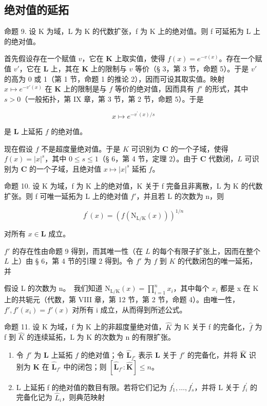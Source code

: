 \subsection{绝对值的延拓}

命题 9. 设 K 为域，L 为 K 的代数扩张，f 为 K 上的绝对值。则 f 可延拓为 L 上的绝对值。

首先假设存在一个赋值 \(v\)，它在 \(\mathbf{K}\) 上取实值，使得 \(f(x) = e^{-v(x)}\)。存在一个赋值 \(v'\)，它在 \(\mathbf{L}\) 上，其在 \(\mathbf{K}\) 上的限制与 \(v\) 等价（§ 3，第 3 节，命题 5）。于是 \(v'\) 的高为 0 或 1（第 1 节，命题 1 的推论 2），因而可设其取实值。映射 \(x \mapsto e^{-v'(x)}\) 在 \(\mathbf{K}\) 上的限制是与 \(f\) 等价的绝对值，因而具有 \(f^s\) 的形式，其中 \(s > 0\)（一般拓扑，第 IX 章，第 3 节，第 2 节，命题 5）。于是

\[
x \mapsto e ^ {- v ^ {\prime} (x) / s}
\]

是 \(\mathbf{L}\) 上延拓 \(f\) 的绝对值。

现在假设 \(f\) 不是超度量绝对值。于是 \(K\) 可识别为 \(\mathbf{C}\) 的一个子域，使得 \(f(x) = |x|^s\)，其中 \(0 \leqslant s \leqslant 1\)（§ 6，第 4 节，定理 2）。由于 \(\mathbf{C}\) 代数闭，\(L\) 可识别为 \(\mathbf{C}\) 的一个子域，且绝对值 \(x \mapsto |x|^s\) 延拓 \(f\)。

命题 10. 设 K 为域，f 为 K 上的绝对值，K 关于 f 完备且非离散，L 为 K 的代数扩张。则 f 可唯一延拓为 L 上的绝对值 \(f'\)，并且若 L 的次数为 n，则

\[
f ^ {\prime} (x) = \left(f (\mathrm{N} _ {\mathrm{L/K}} (x))\right) ^ {1 / n}
\]

对所有 \(x \in \mathbf{L}\) 成立。

\(f'\) 的存在性由命题 9 得到，而其唯一性（在 \(L\) 的每个有限子扩张上，因而在整个 \(L\) 上）由 § 6，第 4 节的引理 2 得到。令 \(f'\) 为 \(f\) 到 \(K\) 的代数闭包的唯一延拓，并

假设 L 的次数为 n。~我们知道 \(\mathrm{N}_{\mathrm{L}/\mathrm{K}}(x)=\prod_{i=1}^{n} x_i\)，其中每个 \(x_{i}\) 都是 x 在 K 上的共轭元（代数，第 VIII 章，第 12 节，第 2 节，命题 4）。由唯一性，\(f', f'(x_{i})=f'(x)\) 对所有 i 成立，从而得到所述公式。

命题 11. 设 K 为域，f 为 K 上的非超度量绝对值，\(\hat{K}\) 为 K 关于 f 的完备化，\(\hat{f}\) 为 f 到 \(\hat{K}\) 的连续延拓，L 为 K 的次数为 n 的有限扩张。

\begin{enumerate}
\def\labelenumi{(\alph{enumi})}
\item
  令 \(f'\) 为 \(\mathbf{L}\) 上延拓 \(f\) 的绝对值；令 \(\hat{\mathbf{L}}_{f'}\) 表示 \(\mathbf{L}\) 关于 \(f'\) 的完备化，并将 \(\hat{\mathbf{K}}\) 识别为 \(\mathbf{K}\) 在 \(\hat{\mathbf{L}}_{f'}\) 中的闭包；则 \([\hat{\mathbf{L}}_{f'}: \hat{\mathbf{K}}] \leqslant n\)。
\item
  L 上延拓 f 的绝对值的数目有限。若将它们记为 \(f_{1}^{\prime}, \ldots, f_{s}^{\prime}\)，并将 L 关于 \(f_{i}^{\prime}\) 的完备化记为 \(\hat{L}_{i}\)，则典范映射
\end{enumerate}

